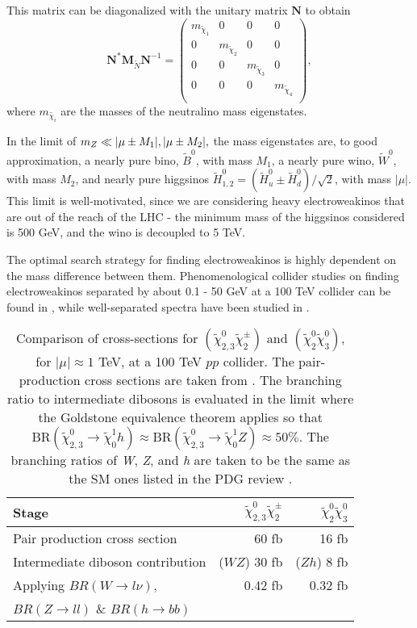 This matrix can be diagonalized with the unitary matrix $\mathbf{N}$ to obtain 
\[\mathbf{N}^*\mathbf{M}_{\widetilde{N}}\mathbf{N}^{-1} =
\begin{pmatrix}
  m_{\widetilde{\chi}_1} & 0 & 0 & 0\\
  0 & m_{\widetilde{\chi}_2} & 0 & 0 \\
  0 & 0 & m_{\widetilde{\chi}_3} & 0 \\
  0 & 0 & 0 &  m_{\widetilde{\chi}_4} \\
\end{pmatrix},
\]
where $m_{\widetilde{\chi_i}}$ are the masses of the neutralino mass eigenstates. 

In the limit of $m_Z \ll |\mu\pm M_1|, |\mu\pm M_2|,$ the mass eigenstates are, to good approximation, a nearly pure bino, $\widetilde{B}^0$, with mass $M_1$, a nearly pure wino, $\widetilde{W}^0$, with mass $M_2$, and nearly pure higgsinos $\widetilde{H}^0_{1,2} = (\widetilde{H}_u^0 \pm \widetilde{H}_d^0)/\sqrt{2}$, with mass $|\mu|$. This limit is well-motivated, since we are considering heavy electroweakinos that are out of the reach of the LHC - the minimum mass of the higgsinos considered is 500 GeV, and the wino is decoupled to 5 TeV. 

The optimal search strategy for finding electroweakinos is highly dependent on the mass difference between them. Phenomenological collider studies on finding electroweakinos separated by about 0.1 - 50 GeV at a 100 TeV collider can be found in \citep{Low:2014cba, Plehn:2009nd, Berlin:2015aba, Cirelli:2014dsa}, while well-separated spectra have been studied in \citep{Gori:2014oua, Acharya:2014pua}.

\begin{table}
\centering
\begin{tabular}{lrr}
\toprule
Stage & $\widetilde{\chi}_{2,3}^0\widetilde{\chi}^\pm_{2}$ & $\widetilde{\chi}^0_{2}\widetilde{\chi}^0_{3}$\\
\midrule
Pair production cross section & 60 fb & 16 fb\\
Intermediate diboson contribution & ($WZ$) 30 fb  & ($Zh$) 8 fb \\
Applying $BR(W\rightarrow l\nu)$, & 0.42 fb & 0.32 fb\\
$BR(Z\rightarrow ll)$ \& $BR(h\rightarrow bb)$ &&\\
\bottomrule
\end{tabular}
\caption{Comparison of cross-sections for $(\widetilde{\chi}_{2,3}^0\widetilde{\chi}^\pm_{2})$ and $(\widetilde{\chi}^0_{2}\widetilde{\chi}^0_{3})$, for $|\mu|\approx 1$ TeV, at a 100 TeV $pp$ collider. The pair-production cross sections are taken from \citep{Gori:2014oua}. The branching ratio to intermediate dibosons is evaluated in the limit where the Goldstone equivalence theorem applies so that $\text{BR}(\widetilde{\chi}_{2,3}^0\rightarrow \widetilde{\chi}_0^1h)\approx \text{BR}(\widetilde{\chi}_{2,3}^0\rightarrow \widetilde{\chi}_0^1Z) \approx 50\%$. The branching ratios of \emph{W}, \emph{Z}, and \emph{h} are taken to be the same as the SM ones listed in the PDG review \citep{Olive2016}.}
\label{tab:xsections}
\end{table}

